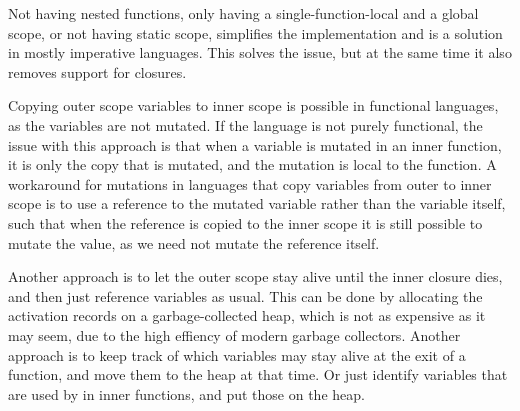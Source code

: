 \documentclass[11pt]{report}
\begin{document}
Not having nested functions, only having a single-function-local and a global scope, or not having static scope, simplifies the implementation and is a solution in mostly imperative languages.
This solves the issue, but at the same time it also removes support for closures.

Copying outer scope variables to inner scope is possible in functional languages, as the variables are not mutated. If the language is not purely functional, the issue with this approach is that when a variable is mutated in an inner function, it is only the copy that is mutated, and the mutation is local to the function.
A workaround for mutations in languages that copy variables from outer to inner scope is to use a reference to the mutated variable rather than the variable itself, such that when the reference is copied to the inner scope it is still possible to mutate the value, as we need not mutate the reference itself.

Another approach is to let the outer scope stay alive until the inner closure dies, and then just reference variables as usual.
This can be done by allocating the activation records on a garbage-collected heap,
which is not as expensive as it may seem, due to the high effiency of modern garbage collectors.
Another approach is to keep track of which variables may stay alive at the exit of a function, and move them to the heap at that time.
Or just identify variables that are used by in inner functions, and put those on the heap.

%
%
%
%
\end{document}
